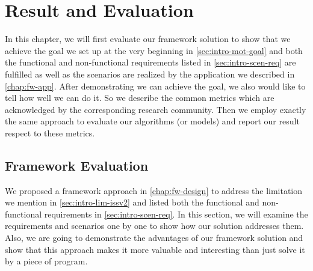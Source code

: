 \chapter{Result and Evaluation}
\label{chap:Evaluation}


In this chapter, we will first evaluate our framework solution to show that we
achieve the goal we set up at the very beginning in \autoref{sec:intro-mot-goal}
and both the functional and non-functional requirements listed in
\autoref{sec:intro-scen-req} are fulfilled as well as the scenarios are
realized by the application we described in \autoref{chap:fw-app}.
After demonstrating we can achieve the goal, we also would like to tell how
well we can do it. So we describe the common metrics which are acknowledged by
the corresponding research community. Then we employ exactly the same approach
to evaluate our algorithms (or models) and report our result respect to these
metrics.

\section{Framework Evaluation}
\label{sec:Eval-framework}

We proposed a framework approach in \autoref{chap:fw-design} to address the
limitation we mention in \autoref{sec:intro-lim-issv2} and listed both the
functional and non-functional requirements in \autoref{sec:intro-scen-req}.
In this section, we will examine the requirements and scenarios one by one to show
how our solution addresses them. Also, we are going to demonstrate the advantages
of our framework solution and show that this approach makes it more valuable and
interesting than just solve it by a piece of program.

